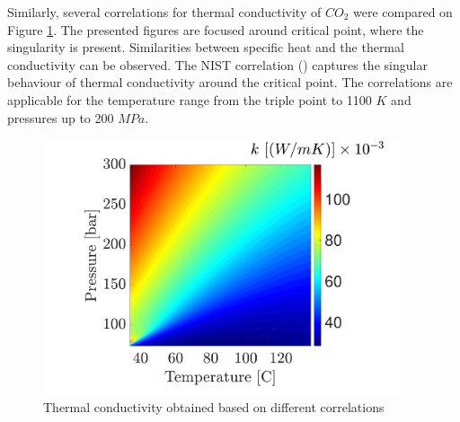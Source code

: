 \documentclass[../Article_Model_Parameters.tex]{subfiles}
\begin{document}
        Similarly, several correlations for thermal conductivity of $CO_2$ were compared on Figure \ref{fig: SFE_Properties_kt}. The presented figures are focused around critical point, where the singularity is present. Similarities between specific heat and the thermal conductivity can be observed. The NIST correlation (\citet{Huber2016}) captures the singular behaviour of thermal conductivity around the critical point. The correlations are applicable for the temperature range from the triple point to 1100 $K$ and pressures up to 200 $MPa$. 

        \begin{figure}[H]
			\centering
			\includegraphics[trim = 1.5cm 2.5cm 1.5cm 2.0cm,clip,width=0.95\textwidth]{Figures/KT.pdf}	
			\caption{Thermal conductivity obtained based on different correlations }
            \label{fig: SFE_Properties_kt}
		\end{figure} 
\end{document}
